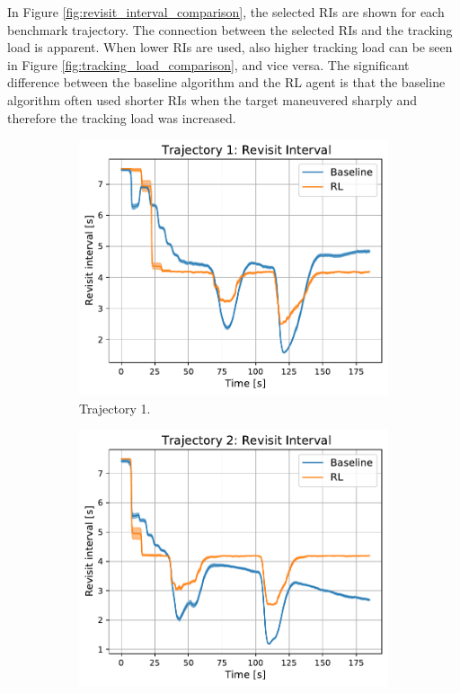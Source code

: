 \documentclass[english, 12pt, a4paper, elec, utf8, a-1b, online]{aaltothesis}
\numberwithin{equation}{section}
\begin{document}
In Figure \ref{fig:revisit_interval_comparison}, the selected RIs are shown for each benchmark trajectory.
The connection between the selected RIs and the tracking load is apparent.
When lower RIs are used, also higher tracking load can be seen in Figure \ref{fig:tracking_load_comparison}, and vice versa.
The significant difference between the baseline algorithm and the RL agent is that the baseline algorithm often used shorter RIs when the target maneuvered sharply and therefore the tracking load was increased.

\begin{figure}
    \centering
    \begin{subfigure}[b]{0.45\textwidth}
        \centering
        \includegraphics[width=\linewidth]{figures/benchmark/Simulations/revisit_intervals_0.pdf}
        \caption{Trajectory 1.}
        \label{fig:RI_T1}
    \end{subfigure}
    \hfill
    \begin{subfigure}[b]{0.45\textwidth}
        \centering
        \includegraphics[width=\linewidth]{figures/benchmark/Simulations/revisit_intervals_1.pdf}

\end{subfigure}
\end{figure}
\end{document}
